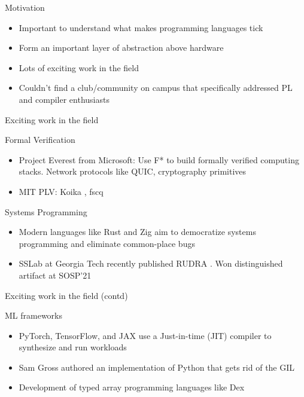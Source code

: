 \documentclass{beamer}
\begin{document}
\begin{frame}{Motivation}
  \begin{itemize}
  \item Important to understand what makes programming languages tick
  \item Form an important layer of abstraction above hardware
  \item Lots of exciting work in the field
  \item Couldn't find a club/community on campus that specifically addressed PL and compiler enthusiasts
  \end{itemize}
\end{frame}

\begin{frame}{Exciting work in the field}
  \begin{exampleblock}{Formal Verification}
    \begin{itemize}
      \item Project Everest from Microsoft: Use F* to build formally verified computing stacks. Network protocols like QUIC, cryptography primitives
      \item MIT PLV: Koika \cite{koika2020}, fscq \cite{chen2015using}
    \end{itemize}
  \end{exampleblock}

  \begin{exampleblock}{Systems Programming}
    \begin{itemize}
    \item Modern languages like Rust and Zig aim to democratize systems programming and eliminate common-place bugs
    \item SSLab at Georgia Tech recently published RUDRA \cite{rudra2021}. Won distinguished artifact at SOSP'21
    \end{itemize}
  \end{exampleblock}
\end{frame}

\begin{frame}{Exciting work in the field (contd)}
    \begin{exampleblock}{ML frameworks}
    \begin{itemize}
    \item PyTorch, TensorFlow, and JAX use a Just-in-time (JIT) compiler to synthesize and run workloads
    \item Sam Gross authored an implementation of Python that gets rid of the GIL \cite{gross2021nogil}
    \item Development of typed array programming languages like Dex \cite{dexlang2021}
    \end{itemize}
  \end{exampleblock}
\end{frame}
\end{document}
